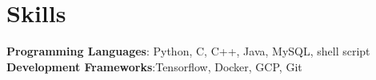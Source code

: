 \section{Skills}
 
\begin{itemize}[leftmargin=0.15in, label={}]
	\small{\item{{}
	
        \textbf{Programming Languages}{: Python, C, C++, Java, MySQL, shell script} \\
		\textbf{Development Frameworks}{:Tensorflow, Docker, GCP, Git}\\
}}
\end{itemize}

